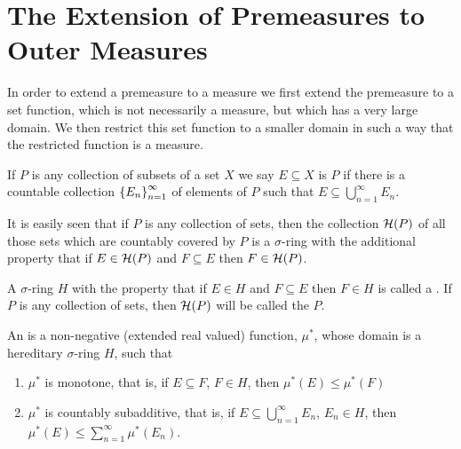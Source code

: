 \section{The Extension of Premeasures to Outer Measures}

In order to extend a premeasure to a measure we first extend the premeasure to a set function, which is not necessarily a measure, but which has a very large domain. We then restrict this set function to a smaller domain in such a way that the restricted function is a measure.

\begin{definition}
If $P$ is any collection of subsets of a set $X$ we say $E\subseteq X$ is  $P$ if there is a countable collection $\left\{E_n\right\}_{n=1}^\infty$ of elements of $P$ such that $E\subseteq\bigcup_{n=1}^\infty E_n$.
\end{definition}

It is easily seen that if $P$ is any collection of sets, then the collection ${\cal H}(P)$ of all those sets which are countably covered by $P$ is a $\sigma$-ring with the additional property that if $E\in{\cal H}(P)$ and $F\subseteq E$ then $F\in{\cal H}(P)$.

\begin{definition}
A $\sigma$-ring $H$ with the property that if $E\in H$ and $F\subseteq E$ then $F\in H$ is called a .
If $P$ is any collection of sets, then ${\cal H}(P)$ will be called the  $P$.
\end{definition}

\begin{definition}
An  is a non-negative (extended real valued) function, $\mu^*$, whose domain is a hereditary $\sigma$-ring $H$, such that
\begin{enumerate}[label=\arabic*)]
    \item\label{def:outer measure 1}
    $\mu^*$ is monotone, that is, if $E\subseteq F$, $F\in H$, then $\mu^*(E)\leq\mu^*(F)$
    \item\label{def:outer measure 2}
    $\mu^*$ is countably subadditive, that is, if $E\subseteq\bigcup_{n=1}^\infty E_n$, $E_n\in H$, then $\mu^*(E)\leq\sum_{n=1}^\infty\mu^*(E_n)$.
\end{enumerate}
\end{definition}

